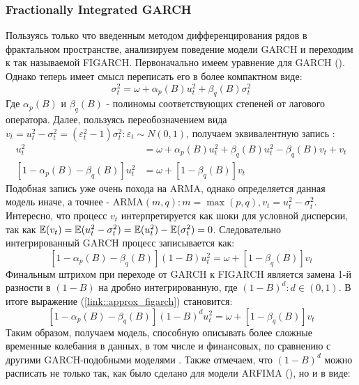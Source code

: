 \subsubsection{Fractionally Integrated GARCH} \label{link::figarch}
Пользуясь только что введенным методом дифференцирования рядов в фрактальном пространстве, анализируем поведение модели GARCH и переходим к так называемой FIGARCH. Первоначально имеем уравнение для GARCH (). Однако теперь имеет смысл переписать его в более компактном виде:
\begin{equation}
	\sigma^2_t = \omega + \alpha_p(B)u^2_t + \beta_q(B)\sigma^2_t
\end{equation}
Где $\alpha_p(B)$ и $\beta_q(B)$ - полиномы соответствующих степеней от лагового оператора. Далее, пользуясь переобозначением вида $v_t = u_t^2 - \sigma^2_t = (\varepsilon^2_{t} - 1)\sigma^2_t: \varepsilon_{t} \sim N(0, 1)$, получаем эквивалентную запись \cite{tayefi2012overview}:
\begin{equation}
	\begin{split}
		u_t^2 & = \omega + \alpha_p(B)u_t^2 + \beta_q(B)u_t^2 - \beta_q(B)v_t + v_t\\
		\left[1 - \alpha_p(B) - \beta_q(B)\right] u_t^2 & = \omega + \left[1 - \beta_q(B)\right]v_t
	\end{split}
\end{equation}
Подобная запись уже очень похода на ARMA, однако определяется данная модель иначе, а точнее - ARMA$(m, q): m = \max(p, q), v_t = u_t^2 - \sigma^2_t$. Интересно, что процесс $v_t$ интерпретируется как шоки для условной дисперсии, так как $\mathbb{E}(v_t) = \mathbb{E}(u_t^2 - \sigma^2_t) = \mathbb{E}(u_t^2) - \mathbb{E}(\sigma^2_t) = 0$. Следовательно интегрированный GARCH процесс записывается как:
\begin{equation} \label{link::approx_figarch}
	\left[1 - \alpha_p(B) - \beta_q(B)\right] (1 - B) u_t^2 = \omega + \left[1 - \beta_q(B)\right]v_t
\end{equation}
Финальным штрихом при переходе от GARCH к FIGARCH является замена 1-й разности в $(1 - B)$ на дробно интегрированную, где $(1 - B)^d: d \in (0, 1)$. В итоге выражение (\ref{link::approx_figarch}) становится:
\begin{equation} \label{link::approx_figarch}
	\left[1 - \alpha_p(B) - \beta_q(B)\right] (1 - B)^d u_t^2 = \omega + \left[1 - \beta_q(B)\right]v_t
\end{equation}
Таким образом, получаем модель, способную описывать более сложные временные колебания в данных, в том числе и финансовых, по сравнению с другими GARCH-подобными моделями \cite{davidson2004moment}. Также отмечаем, что $(1 - B)^d$ можно расписать не только так, как было сделано для модели ARFIMA (), но и в виде:
